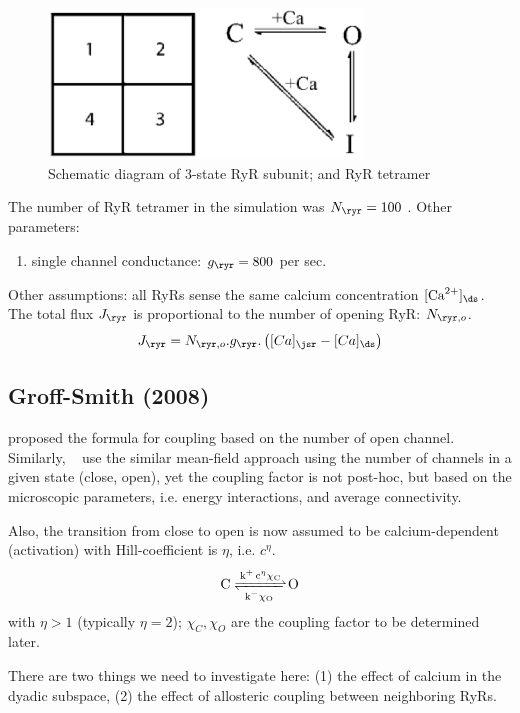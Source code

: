  \begin{figure}[hbt]
  \centerline{\includegraphics[height=4cm]{./images/Wang2005_RyR.eps}}
\caption{Schematic diagram of 3-state RyR subunit; and RyR tetramer}
\label{fig:Wang2005_RyR}
\end{figure}

The number of RyR tetramer in the simulation was $N_\ryr=100$ \citep{28}.
Other parameters:
\begin{enumerate}
  \item single channel conductance: $g_\ryr = 800$ per sec.
\end{enumerate}
Other assumptions: all RyRs sense the same calcium concentration $[\Ca]_\ds$.
The total flux $J_\ryr$ is proportional to the number of opening RyR:
$N_{\ryr,o}$.
\begin{equation}
J_\ryr = N_{\ryr,o}.g_\ryr.\left([Ca]_\jsr-[Ca]_\ds\right)
\end{equation}


\subsection{Groff-Smith (2008)}
\label{sec:RYR_Groff2008}

\citep{sobie2002tcas} proposed the formula for coupling based
on the number of open channel. Similarly, ~\citep{groff2008} use the similar
mean-field approach using the number of channels in a given state (close, open),
yet the coupling factor is not post-hoc, but based on the microscopic
parameters, i.e. energy interactions, and average connectivity.

Also, the transition from close to open is now assumed to be
calcium-dependent (activation) with Hill-coefficient is $\eta$, i.e. $c^\eta$.
\begin{equation}
  \label{eq:1131}
  \ce{C <=>[\ce{k^+ c^\eta \chi_C}][k^-\chi_O] O}
\end{equation}
with $\eta > 1$ (typically $\eta=2$); $\chi_C, \chi_O$ are the coupling factor
to be determined later.

There are two things we need to investigate here: (1) the effect of
calcium in the dyadic subspace, (2) the effect of allosteric coupling between
neighboring RyRs.

